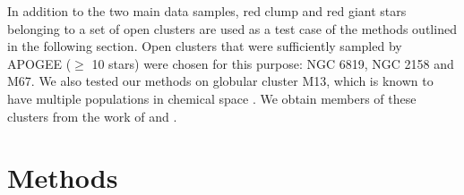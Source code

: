 \documentclass[a4paper,fleqn,usenatbib]{mnras}
\begin{document}
In addition to the two main data samples, red clump and red giant stars belonging to a set of open clusters are used as a test case of the methods outlined in the following section. Open clusters that were sufficiently sampled by APOGEE ($\geq$ 10 stars) were chosen for this purpose: NGC 6819, NGC 2158 and M67. We also tested our methods on globular cluster M13, which is known to have multiple populations in chemical space \citep{Carretta2009}. We obtain members of these clusters from the work of \citet{Meszaros2013} and \citet{Meszaros2015}.




\section{Methods}
\label{sec:methods}
\end{document}
